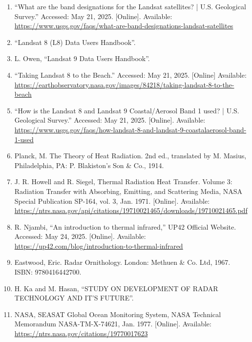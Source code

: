 \documentclass{article}
\begin{document}
\begin{sloppypar}
\begin{enumerate}
    \item{“What are the band designations for the Landsat satellites? | U.S. Geological Survey.” Accessed: May 21, 2025. [Online]. Available: \url{https://www.usgs.gov/faqs/what-are-band-designations-landsat-satellites}}

    \item{“Landsat 8 (L8) Data Users Handbook”.}

    \item{L. Owen, “Landsat 9 Data Users Handbook”.}

    \item{“Taking Landsat 8 to the Beach.” Accessed: May 21, 2025. [Online] Available: \url{https://earthobservatory.nasa.gov/images/84218/taking-landsat-8-to-the-beach}}

    \item{“How is the Landsat 8 and Landsat 9 Coastal/Aerosol Band 1 used? | U.S. Geological Survey.” Accessed: May 21, 2025. [Online]. Available: \url{https://www.usgs.gov/faqs/how-landsat-8-and-landsat-9-coastalaerosol-band-1-used}}

    \item{Planck, M. The Theory of Heat Radiation. 2nd ed., translated by M. Masius, Philadelphia, PA: P. Blakiston's Son & Co., 1914.}

    \item{J. R. Howell and R. Siegel, Thermal Radiation Heat Transfer. Volume 3: Radiation Transfer with Absorbing, Emitting, and Scattering Media, NASA Special Publication SP-164, vol. 3, Jan. 1971. [Online]. Available: \url{https://ntrs.nasa.gov/api/citations/19710021465/downloads/19710021465.pdf}}

    \item {R. Njambi, “An introduction to thermal infrared,” UP42 Official Website. Accessed: May 24, 2025. [Online]. Available: \url{https://up42.com/blog/introduction-to-thermal-infrared}}

    \item{Eastwood, Eric. Radar Ornithology. London: Methuen & Co. Ltd, 1967. ISBN: 9780416442700.}

    \item{H. Ka and M. Hasan, “STUDY ON DEVELOPMENT OF RADAR TECHNOLOGY AND IT’S FUTURE”.}

    \item{NASA, SEASAT Global Ocean Monitoring System, NASA Technical Memorandum NASA-TM-X-74621, Jan. 1977. [Online]. Available: \url{https://ntrs.nasa.gov/citations/19770017623}}


\end{enumerate}
\end{sloppypar}
\end{document}
